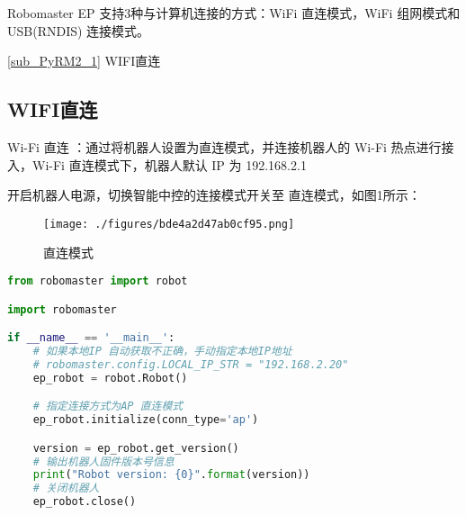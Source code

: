 
Robomaster EP 支持3种与计算机连接的方式：WiFi 直连模式，WiFi 组网模式和 USB(RNDIS) 连接模式。

\autoref{sub_PyRM2_1} WIFI直连

\subsection{WIFI直连}\label{sub_PyRM2_1}

Wi-Fi 直连 ：通过将机器人设置为直连模式，并连接机器人的 Wi-Fi 热点进行接入，Wi-Fi 直连模式下，机器人默认 IP 为 192.168.2.1

开启机器人电源，切换智能中控的连接模式开关至 直连模式，如图1所示：

\begin{figure}[ht]
\centering
\texttt{[image: ./figures/bde4a2d47ab0cf95.png]}
\caption{直连模式} \label{fig_PyRM2_1}
\end{figure}

\begin{lstlisting}[language=python]
from robomaster import robot

import robomaster

if __name__ == '__main__':
    # 如果本地IP 自动获取不正确，手动指定本地IP地址
    # robomaster.config.LOCAL_IP_STR = "192.168.2.20"
    ep_robot = robot.Robot()

    # 指定连接方式为AP 直连模式
    ep_robot.initialize(conn_type='ap')

    version = ep_robot.get_version()
    # 输出机器人固件版本号信息
    print("Robot version: {0}".format(version))
    # 关闭机器人
    ep_robot.close()
\end{lstlisting}